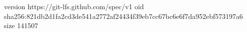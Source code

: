 version https://git-lfs.github.com/spec/v1
oid sha256:821db2d1fa2cd3de541a2772af24434f39eb7cc67bc6e6f7da952ebf573197a6
size 141507
